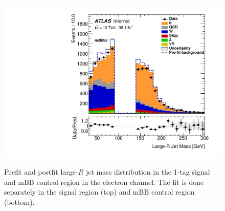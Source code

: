 \begin{figure}[!htbp]
\begin{center}
\includegraphics[scale=0.33]{./figures/boosted/ABCD_1tag0bjet/QCDFloat_1tag_mBBcrFit_mBBcr_El_Postfit}\\
\caption{Prefit and postfit large-$R$ jet mass distribution in the 1-tag signal and mBB control region in the electron channel. The fit is done separately
in the signal region (top) and mBB control region (bottom).}
\label{fig:boostedabcd_mbbcrSRsepa_elec_fit}
\end{center}
\end{figure}

